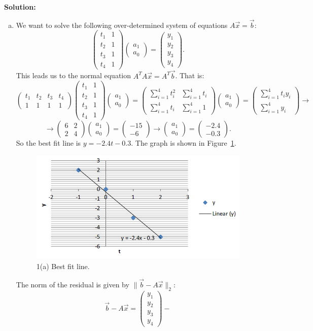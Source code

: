 \documentclass{article}
\newcommand{\normII}[1]{\|#1\|_2}
\newcommand{\pmat}[1]{\begin{pmatrix}#1\end{pmatrix}}
\begin{document}
{\bf Solution:}
\begin{enumerate}[(a)]
\item We want to solve the following over-determined system of equations $A\vec x = \vec b$:
\[ \pmat{t_1 & 1\\
		t_2 & 1\\
		t_3 & 1\\
		t_4 & 1 }
   \pmat{a_1 \\ a_0} =
   \pmat{y_1\\ y_2\\ y_3\\ y_4}. \]
This leads us to the normal equation $A^TA\vec x = A^T \vec b$. That is:
\[ \pmat{t_1 & t_2 & t_3 & t_4\\ 1 & 1 & 1 & 1}
   \pmat{t_1 & 1\\
		t_2 & 1\\
		t_3 & 1\\
		t_4 & 1 }
   \pmat{a_1 \\ a_0} =
   \pmat{\sum\limits_{i=1}^4 t_i^2 & \sum\limits_{i=1}^4 t_i\\
		\sum\limits_{i=1}^4 t_i & \sum\limits_{i=1}^4 1 }
   \pmat{a_1 \\ a_0} = 
   \pmat{\sum\limits_{i=1}^4 t_i y_i\\ \sum\limits_{i=1}^4 y_i } \to \]
\[ \to \pmat{6 & 2 \\ 2 & 4 } \pmat{a_1\\ a_0 } = \pmat{-15\\ -6} \to    
   \pmat{a_1\\ a_0 } = \pmat{-2.4\\ -0.3} . \]
So the best fit line is $y= -2.4 t - 0.3$. The graph is shown in Figure~\ref{fig:pb1a}.
\begin{figure}[ht!]
\centering
\includegraphics[width=.8\linewidth]{pb1a.png}
\caption{1(a) Best fit line.}
\label{fig:pb1a}
\end{figure}
The norm of the residual is given by $\normII{\vec b-A\vec x}$:
\[ \vec b-A\vec x =
  \pmat{y_1\\ y_2\\ y_3\\ y_4} - 
\]
\end{enumerate}
\end{document}
